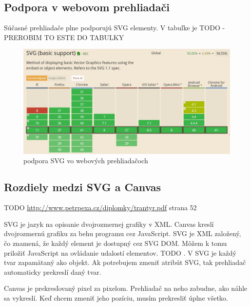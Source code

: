  
 \subsection{Podpora v webovom prehliadači}
 Súčasné prehliadače plne podporujú SVG elementy.
 V tabuľke je TODO - PREROBIM TO ESTE DO TABULKY 
 \begin{figure}
\centering
\includegraphics[width=0.7\linewidth]{obrazky/podpora}
\caption{podpora SVG vo webových prehliadačoch}
\label{fig:podpora}
\end{figure}

 
 
 \subsection{Rozdiely medzi SVG a Canvas}
TODO \url{http://www.petrpexa.cz/diplomky/trantyr.pdf} strana 52


 SVG je jazyk na opisanie dvojrozmernej grafiky v XML. 
 Canvas kreslí dvojrozmernú grafiku za behu programu cez JavaScript.
 SVG je XML založený, čo znamená, že každý element je dostupný cez SVG DOM. Môžem k tomu priložiť JavaScript na ovládanie udalostí elementov. TODO . 
 V SVG je každý tvar zapamätaný ako objekt. Ak potrebujem zmeniť atribút SVG, tak prehliadač  automaticky prekreslí daný tvar.
 
 
 Canvas je prekresľovaný pixel za pixelom. Prehliadač na neho zabudne, ako náhle sa vykreslí. Keď chcem zmeniť jeho pozíciu, musím prekresliť úplne všetko. 
 
 
 
